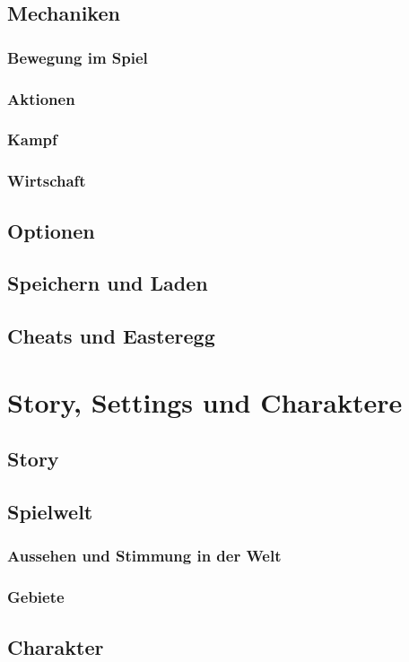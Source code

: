 \documentclass[envcountsame,envcountchap deutsch]{i-studis}
\begin{document}
	\section{Mechaniken}
		\subsection{Bewegung im Spiel}
		\subsection{Aktionen}
		\subsection{Kampf}
		\subsection{Wirtschaft}
	\section{Optionen}
	\section{Speichern und Laden}
	\section{Cheats und Easteregg}
\chapter{Story, Settings und Charaktere}
	\section{Story}
	\section{Spielwelt}
		\subsection{Aussehen und Stimmung in der Welt}
		\subsection{Gebiete}
	\section{Charakter}
\end{document}
